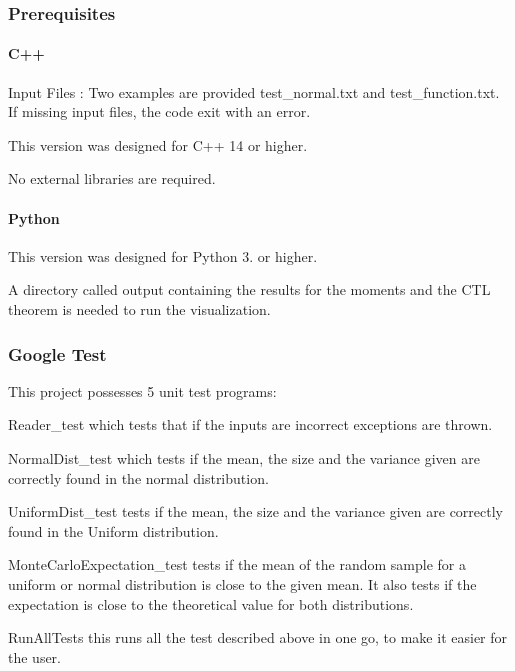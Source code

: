 \subsubsection*{Prerequisites}

\paragraph*{C++}


\begin{DoxyItemize}
\item Input Files \+: Two examples are provided \textquotesingle{}test\+\_\+normal.\+txt\textquotesingle{} and \textquotesingle{}test\+\_\+function.\+txt\textquotesingle{}. If missing input files, the code exit with an error.
\item This version was designed for C++ 14 or higher.
\item No external libraries are required. \paragraph*{Python}
\end{DoxyItemize}


\begin{DoxyItemize}
\item This version was designed for Python 3. or higher.
\item A directory called \textquotesingle{}output\textquotesingle{} containing the results for the moments and the C\+TL theorem is needed to run the visualization.
\end{DoxyItemize}

\subsubsection*{Google Test}

This project possesses 5 unit test programs\+:
\begin{DoxyItemize}
\item Reader\+\_\+test which tests that if the inputs are incorrect exceptions are thrown.
\item Normal\+Dist\+\_\+test which tests if the mean, the size and the variance given are correctly found in the normal distribution.
\item Uniform\+Dist\+\_\+test tests if the mean, the size and the variance given are correctly found in the Uniform distribution.
\item Monte\+Carlo\+Expectation\+\_\+test tests if the mean of the random sample for a uniform or normal distribution is close to the given mean. It also tests if the expectation is close to the theoretical value for both distributions.
\item Run\+All\+Tests this runs all the test described above in one go, to make it easier for the user.
\end{DoxyItemize}

